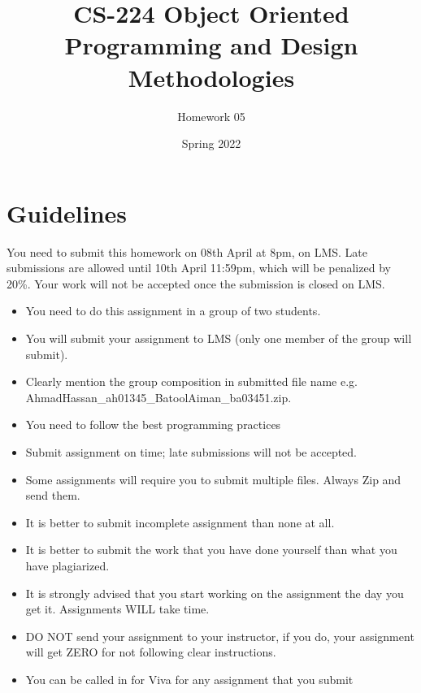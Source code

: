 \documentclass[a4paper,12pt]{article}
\begin{document}
	
	\title{CS-224 Object Oriented Programming and Design Methodologies }
	\author{Homework 05}
	\date{Spring 2022}
	\maketitle
	\section{Guidelines}
	
	You need to submit this homework on  {\color{blue}08th April at 8pm}, on LMS. Late submissions are allowed until {\color{red} 10th April 11:59pm}, which will be penalized by 20\%. Your work will not be accepted once the submission is closed on LMS.

	
	\begin{itemize}
		\item You need to do this assignment in a group of two students.
		\item You will submit your assignment to LMS (only one member of the group will submit).
		\item Clearly mention the group composition in submitted file name e.g. AhmadHassan\_ah01345\_BatoolAiman\_ba03451.zip. 
		\item You need to follow the best programming practices 
		\item Submit assignment on time; late submissions will not be accepted.
		\item Some assignments will require you to submit multiple files. Always Zip and send them.
		\item It is better to submit incomplete assignment than none at all.
		\item It is better to submit the work that you have done yourself than what you have plagiarized.
		\item It is strongly advised that you start working on the assignment the day you get it. Assignments WILL take time.
		\item DO NOT send your assignment to your instructor, if you do, your assignment will get ZERO for not following clear instructions.
		\item You can be called in for Viva for any assignment that you submit
	\end{itemize}
	
\end{document}
